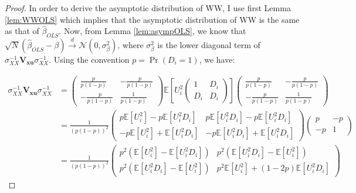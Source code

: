 \documentclass[
]{book}
\newcommand{\esp}[1]{\mathbb{E}[ #1 ]}
\theoremstyle{definition}
\theoremstyle{definition}
\theoremstyle{definition}
\theoremstyle{definition}
\theoremstyle{remark}
\begin{document}
\begin{proof}
\iffalse{} {Proof. } \fi{}In order to derive the asymptotic distribution of WW, I use first Lemma \ref{lem:WWOLS} which implies that the asymptotic distribution of WW is the same as that of \(\hat{\beta}_{OLS}\).
Now, from Lemma \ref{lem:asympOLS}, we know that \(\sqrt{N}(\hat{\beta}_{OLS}-\beta)\stackrel{d}{\rightarrow}\mathcal{N}(0,\sigma^2_{\beta})\), where \(\sigma^2_{\beta}\) is the lower diagonal term of \(\sigma_{XX}^{-1}\mathbf{V_{xu}}\sigma_{XX}^{-1}\).
Using the convention \(p=\Pr(D_i=1)\), we have:

\begin{align*}
\sigma_{XX}^{-1}\mathbf{V_{xu}}\sigma_{XX}^{-1} 
                  & = \left(\begin{array}{cc}  
                                          \frac{p}{p(1-p)} & -\frac{p}{p(1-p)}\\
                                          -\frac{p}{p(1-p)} & \frac{1}{p(1-p)} 
                          \end{array}\right)
                          \esp{U_i^2\left(\begin{array}{cc}  1 & D_i\\  D_i & D_i\end{array}\right)}        
                          \left(\begin{array}{cc}  
                                          \frac{p}{p(1-p)} & -\frac{p}{p(1-p)}\\
                                          -\frac{p}{p(1-p)} & \frac{1}{p(1-p)} 
                          \end{array}\right)\\
                  & = \frac{1}{(p(1-p))^2}
                          \left(\begin{array}{cc}  
                                          p\esp{U_i^2}-p\esp{U_i^2D_i} & p\esp{U_i^2D_i}-p\esp{U_i^2D_i}\\
                                          -p\esp{U_i^2}+\esp{U_i^2D_i} &  -p\esp{U_i^2D_i}+\esp{U_i^2D_i}
                          \end{array}\right)
                         \left(\begin{array}{cc}  
                                          p & -p\\
                                          -p & 1 
                          \end{array}\right)\\
                 & = \frac{1}{(p(1-p))^2}
                          \left(\begin{array}{cc}  
                                          p^2(\esp{U_i^2}-\esp{U_i^2D_i}) & p^2(\esp{U_i^2D_i}-\esp{U_i^2})\\
                                          p^2(\esp{U_i^2D_i}-\esp{U_i^2}) &  p^2\esp{U_i^2}+(1-2p)\esp{U_i^2D_i}
                          \end{array}\right)
 \end{align*}


\end{proof}
\end{document}
